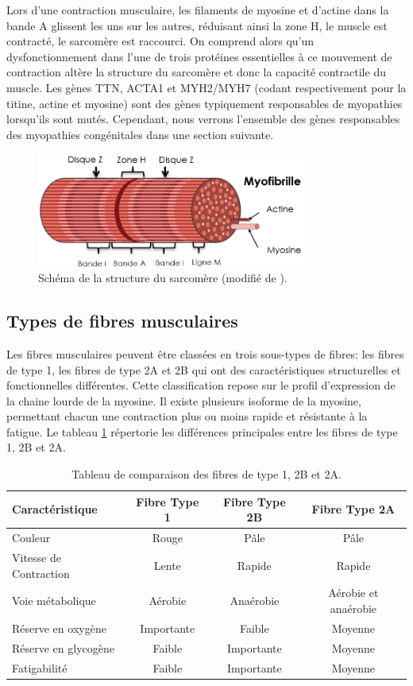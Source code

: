 Lors d'une contraction musculaire, les filaments de myosine et d'actine dans la bande A glissent les uns sur les autres, réduisant ainsi la zone H, le muscle est contracté, le sarcomère est raccourci. On comprend alors qu'un dysfonctionnement dans l'une de trois protéines essentielles à ce mouvement de contraction altère la structure du sarcomère et donc la capacité contractile du muscle. Les gènes TTN, ACTA1 et MYH2/MYH7 (codant respectivement pour la titine, actine et myosine) sont des gènes typiquement responsables de myopathies lorsqu'ils sont mutés. Cependant, nous verrons l'ensemble des gènes responsables des myopathies congénitales dans une section suivante.
\begin{figure}[!ht]
 \centering
 \includegraphics[width=0.8\textwidth]{figures/sarcomere.png}
 \caption[Schéma de la structure du sarcomère.]{Schéma de la structure du sarcomère (modifié de \cite{burr_basic_2019}).}
 \label{fig:sarcomere}
\end{figure}

\subsection{Types de fibres musculaires}
Les fibres musculaires peuvent être classées en trois sous-types de fibres: les fibres de type 1, les fibres de type 2A et 2B qui ont des caractéristiques structurelles et fonctionnelles différentes. Cette classification repose sur le profil d'expression de la chaine lourde de la myosine. Il existe plusieurs isoforme de la myosine, permettant chacun une contraction plus ou moins rapide et résistante à la fatigue. Le tableau \ref{table:fiber-compare} répertorie les différences principales entre les fibres de type 1, 2B et 2A.

\begin{table}[!ht]
\centering
\begin{tabular}{|l|c|c|c|} 
 \hline
 \textbf{Caractéristique} & \textbf{Fibre Type 1} & \textbf{Fibre Type 2B}  & \textbf{Fibre Type 2A} \\
 \hline
Couleur & Rouge & Pâle & Pâle \\
Vitesse de Contraction & Lente & Rapide & Rapide \\
Voie métabolique & Aérobie & Anaérobie & Aérobie et anaérobie \\
Réserve en oxygène & Importante & Faible & Moyenne \\
Réserve en glycogène & Faible & Importante & Moyenne \\
Fatigabilité & Faible & Importante & Moyenne \\
 \hline
\end{tabular}
\caption{Tableau de comparaison des fibres de type 1, 2B et 2A.}
\label{table:fiber-compare}
\end{table}


